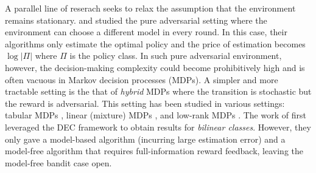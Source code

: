 A parallel line of reserach seeks to relax the assumption that the environment remains stationary. \cite{foster2022complexity} and \cite{xu2023bayesian} studied the pure adversarial setting where the environment can choose a different model in every round. In this case, their algorithms only estimate the optimal policy and the price of estimation becomes $\log|\Pi|$ where $\Pi$ is the policy class. 
In such pure adversarial environment, however, the decision-making complexity could become prohibitively high and is often vacuous in Markov decision processes (MDPs). 
A simpler and more tractable setting is the that of \emph{hybrid} MDPs where the transition is stochastic but the reward is adversarial. This setting has been studied in various settings: tabular MDPs \citep{neu2013online, rosenberg2019online, jin2020learning, shani2020optimistic}, linear (mixture) MDPs \citep{luo2021policy, dai2023refined, sherman2023improved, liu2023towards, kong2023improved, li2024improved}, and low-rank MDPs \citep{zhao2023learning, liu2024beating}. The work of \cite{liu2025decision} first leveraged the DEC framework to obtain results for \emph{bilinear classes}. However, they only gave a model-based algorithm (incurring large estimation error) and a model-free algorithm that requires full-information reward feedback, leaving the model-free bandit case open.  



